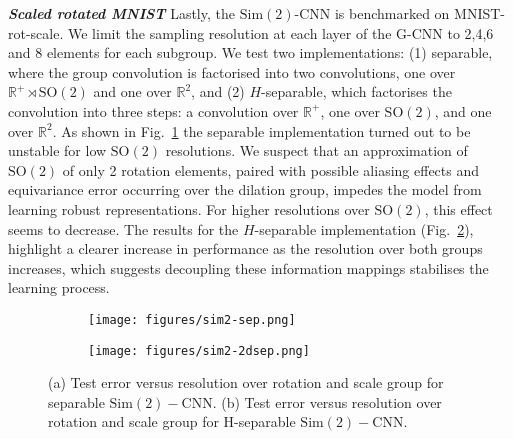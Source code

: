 \documentclass[nohyperref]{article}
\theoremstyle{plain}
\theoremstyle{definition}
\theoremstyle{remark}
\newcommand{\R}{\mathbb{R}}
\begin{document}
\textbf{\textit{Scaled rotated MNIST}} Lastly, the $\mathrm{Sim(2)}$-CNN is benchmarked on MNIST-rot-scale. We limit the sampling resolution at each layer of the G-CNN to 2,4,6 and 8 elements for each subgroup. We test two implementations: (1) separable, where the group convolution is factorised into two convolutions, one over $\R^+ {\rtimes} \mathrm{SO(2)}$ and one over $\R^2$, and (2) $H$-separable, which factorises the convolution into three steps:  a convolution over $\R^+$, one over $\mathrm{SO(2)}$, and one over $\R^2$. As shown in Fig.~\ref{fig:sim2sep} the separable implementation turned out to be unstable for low $\mathrm{SO(2)}$ resolutions. We suspect that an approximation of $\mathrm{SO(2)}$ of only 2 rotation elements, paired with possible aliasing effects and equivariance error occurring over the dilation group, impedes the model from learning robust representations. For higher resolutions over $\mathrm{SO(2)}$, this effect seems to decrease. The results for the $H$-separable implementation (Fig.~\ref{fig:sim2dsep}), highlight a clearer increase in performance as the resolution over both groups increases, which suggests decoupling these information mappings stabilises the learning process.
\begin{figure}
    \centering
    \begin{subfigure}[b]{0.23\textwidth}
        \texttt{[image: figures/sim2-sep.png]}
        \caption{\vspace{-3mm}}
        \label{fig:sim2sep}
    \end{subfigure}
    \begin{subfigure}[b]{0.23\textwidth}
        \texttt{[image: figures/sim2-2dsep.png]}
        \caption{\vspace{-3mm}}
        \label{fig:sim2dsep}
    \end{subfigure} 
    \caption{(a) Test error versus resolution over rotation and scale group for separable $\mathrm{Sim(2)}-$CNN. (b) Test error versus resolution over rotation and scale group for $\text{H}$-separable $\mathrm{Sim(2)}-$CNN.}
    \label{fig:se2-exps}
\end{figure}
\end{document}
